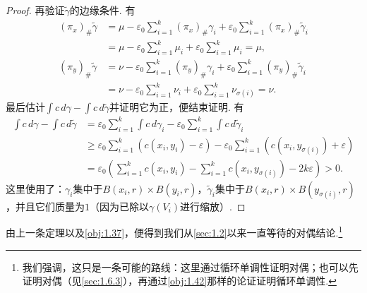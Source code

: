 \begin{proof}
再验证$\widetilde\gamma$的边缘条件. 有
\begin{equation*}
\begin{aligned}
(\pi_x)_\#\widetilde\gamma
&=\mu-\varepsilon_0\sum_{i=1}^k(\pi_x)_\#\gamma_i
+\varepsilon_0\sum_{i=1}^k(\pi_x)_\#\widetilde\gamma_i\\
&=\mu-\varepsilon_0\sum_{i=1}^k\mu_i+\varepsilon_0\sum_{i=1}^k\mu_i=\mu,\\
(\pi_y)_\#\widetilde\gamma
&=\nu-\varepsilon_0\sum_{i=1}^k(\pi_y)_\#\gamma_i
+\varepsilon_0\sum_{i=1}^k(\pi_y)_\#\widetilde\gamma_i\\
&=\nu-\varepsilon_0\sum_{i=1}^k\nu_i+\varepsilon_0\sum_{i=1}^k\nu_{\sigma(i)}=\nu.
\end{aligned}
\end{equation*}
最后估计$\int c\,d\gamma-\int c\,d\widetilde\gamma$并证明它为正，便结束证明. 有
\begin{equation*}
\begin{aligned}
\int c\,d\gamma-\int c\,d\widetilde\gamma
&=\varepsilon_0\sum_{i=1}^k\int c\,d\gamma_i
-\varepsilon_0\sum_{i=1}^k\int c\,d\widetilde\gamma_i\\
&\ge\varepsilon_0\sum_{i=1}^k(c(x_i,y_i)-\varepsilon)
-\varepsilon_0\sum_{i=1}^k(c(x_i,y_{\sigma(i)})+\varepsilon)\\
&=\varepsilon_0\left(\sum_{i=1}^k c(x_i,y_i)
-\sum_{i=1}^k c(x_i,y_{\sigma(i)})-2k\varepsilon\right)>0.
\end{aligned}
\end{equation*}
这里使用了：$\gamma_i$集中于$B(x_i,r)\times B(y_i,r)$，$\widetilde\gamma_i$集中于$B(x_i,r)\times B(y_{\sigma(i)},r)$，并且它们质量为$1$（因为已除以$\gamma(V_i)$进行缩放）.
\end{proof}

由上一条定理以及\autoref{obj:1.37}，便得到我们从\autoref{sec:1.2}以来一直等待的对偶结论.\footnote{我们强调，这只是一条可能的路线：这里通过循环单调性证明对偶；也可以先证明对偶（见\autoref{sec:1.6.3}），再通过\autoref{obj:1.42}那样的论证证明循环单调性.}

